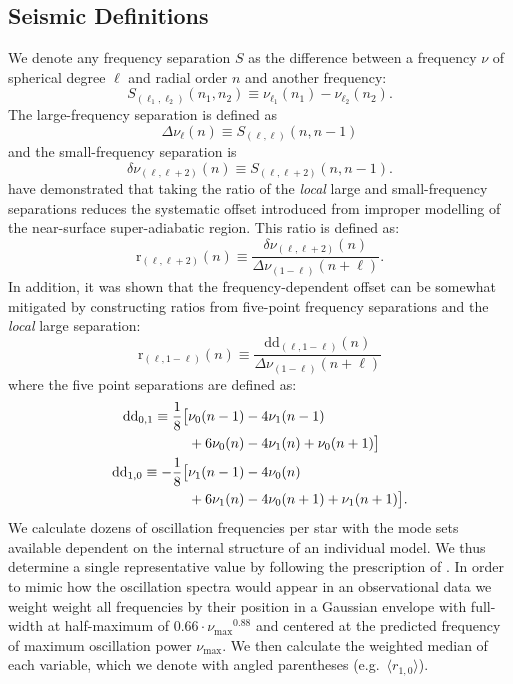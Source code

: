 \subsection{Seismic Definitions} 
\label{sec:sdefs}
We denote any frequency separation $S$ as the difference between a frequency $\nu$ of spherical degree $\ell$ and radial order $n$ and another frequency: 
\begin{equation} 
  S_{(\ell_1, \ell_2)}(n_1, n_2) \equiv \nu_{\ell_1}(n_1) - \nu_{\ell_2}(n_2).
\end{equation}
The large-frequency separation is defined as
\begin{equation} 
  \Delta\nu_\ell(n) \equiv S_{(\ell, \ell)}(n, n-1)
\end{equation}
and the small-frequency separation is
\begin{equation}
  \delta\nu_{(\ell, \ell+2)}(n) \equiv S_{(\ell, \ell+2)}(n, n-1).
\end{equation}
\citet{2003A&A...411..215R} have demonstrated that taking the ratio of the \emph{local} large and small-frequency separations reduces the systematic offset introduced from improper modelling of the near-surface super-adiabatic region. This ratio is defined as: 
\begin{equation}    %
  \mathrm{r}_{(\ell,\ell +2)}(n) \equiv \frac{\delta\nu_{(\ell, \ell+2)}(n)}{\Delta\nu_{(1-\ell)}(n+\ell)}.
\end{equation}
In addition, it was shown that the frequency-dependent offset can be somewhat mitigated by constructing ratios from five-point frequency separations and the \emph{local} large separation:
\begin{equation} 
  \mathrm{r}_{(\ell, 1-\ell)}(n) \equiv \frac{\mathrm{dd}_{(\ell,1-\ell)}(n)}{\Delta\nu_{(1-\ell)}(n+\ell)} %
\end{equation}
where the five point separations are defined as:
\begin{align} 
  \mathrm{dd}_{0,1} \equiv \frac{1}{8} \big[&\nu_0(n-1) - 4\nu_1(n-1) \notag\\
                                 &+6\nu_0(n) - 4\nu_1(n) + \nu_0(n+1)\big]\\ 
  \mathrm{dd}_{1,0} \equiv -\frac{1}{8} \big[&\nu_1(n-1) - 4\nu_0(n) \notag\\
                                &+6\nu_1(n) - 4\nu_0(n+1) + \nu_1(n+1)\big]. \label{eqn:dlast}
\end{align}
We calculate dozens of oscillation frequencies per star with the mode sets available dependent on the internal structure of an individual model. We thus determine a single representative value 
by following the prescription of \citet{2012A&A...537A..30M}. In order to mimic how the oscillation spectra would appear in an observational data we weight weight all frequencies by their position in a Gaussian envelope with  full-width at half-maximum of ${0.66\cdot\nu_{\max}{}^{0.88}}$ and centered at the predicted frequency of maximum oscillation power $\nu_{\max}$.  We then calculate the weighted median of each variable, which we denote with angled parentheses (e.g.\ ${\langle r_{1,0}\rangle}$).





